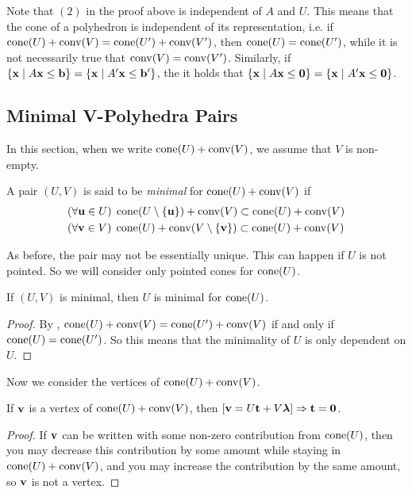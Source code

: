 \begin{Remark}\label{re_characteristic_cone}  Note that $(2)$ in the proof above is independent of $A$ and $U$.  This means that the cone of a polyhedron is independent of its representation, i.e. if $\operatorname{cone}(U) + \operatorname{conv}(V) = \operatorname{cone}(U') + \operatorname{conv}(V')$, then $\operatorname{cone}(U) = \operatorname{cone}(U')$, while it is not necessarily true that $\operatorname{conv}(V) = \operatorname{conv}(V')$.  Similarly, if $\left\{\mathbf{x}\;|\; A\mathbf{x}\leq \mathbf{b}\right\} = \left\{\mathbf{x}\;|\; A'\mathbf{x}\leq \mathbf{b}'\right\}$, the it holds that $\left\{\mathbf{x}\;|\; A\mathbf{x}\leq\mathbf{0}\right\} = \left\{\mathbf{x}\;|\; A'\mathbf{x}\leq\mathbf{0}\right\}$.
\end{Remark}

\subsection{Minimal V-Polyhedra Pairs}

In this section, when we write $\operatorname{cone}(U) + \operatorname{conv}(V)$, we assume that $V$ is non-empty.

\begin{Def}
	A pair $(U,V)$ is said to be \textit{minimal} for $\operatorname{cone}(U) + \operatorname{conv}(V)$ if
	\begin{align}
		 & (\forall \mathbf{u}\in U)\;\operatorname{cone}(U\setminus\left\{\mathbf{u}\right\}) + \operatorname{conv}(V) \subset \operatorname{cone}(U) + \operatorname{conv}(V) \\
		 & (\forall \mathbf{v}\in V)\;\operatorname{cone}(U) + \operatorname{conv}(V\setminus\left\{\mathbf{v}\right\}) \subset \operatorname{cone}(U) + \operatorname{conv}(V)
	\end{align}
\end{Def}

As before, the pair may not be essentially unique.  This can happen if $U$ is not pointed.  So we will consider only pointed cones for $\operatorname{cone}(U)$.

\begin{Prop}\label{u_min}
	If $(U,V)$ is minimal, then $U$ is minimal for $\operatorname{cone}(U)$.
\end{Prop}

\begin{proof}
	By , $\operatorname{cone}(U) + \operatorname{conv}(V) = \operatorname{cone}(U') + \operatorname{conv}(V)$ if and only if $\operatorname{cone}(U) = \operatorname{cone}(U')$.  So this means that the minimality of $U$ is only dependent on $U$.
\end{proof}

Now we consider the vertices of $\operatorname{cone}(U) + \operatorname{conv}(V)$.

\begin{Prop}\label{v_t_must_be_z}
	If $\mathbf{v}$ is a vertex of $\operatorname{cone}(U) + \operatorname{conv}(V)$, then $[\mathbf{v} = U\mathbf{t} + V\bm{\lambda}] \Rightarrow \mathbf{t} = \mathbf{0}$.
\end{Prop}

\begin{proof}
	If $\mathbf{v}$ can be written with some non-zero contribution from $\operatorname{cone}(U)$, then you may decrease this contribution by some amount while staying in $\operatorname{cone}(U) + \operatorname{conv}(V)$, and you may increase the contribution by the same amount, so $\mathbf{v}$ is not a vertex.
\end{proof}

